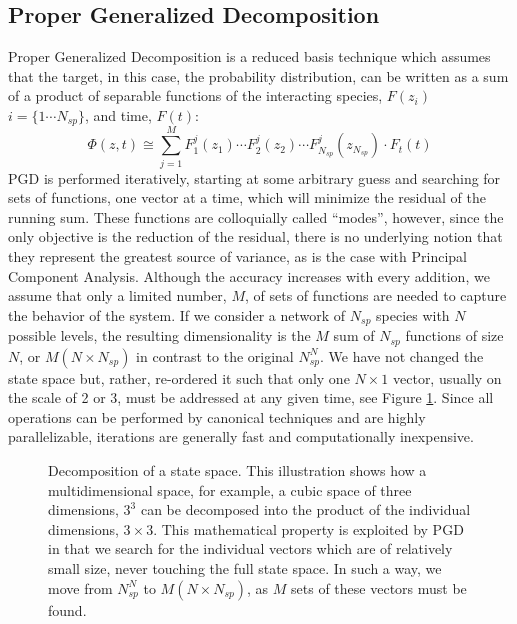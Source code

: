 \documentclass{article}
\begin{document}
\subsection{Proper Generalized Decomposition}\label{PGD}
Proper Generalized Decomposition \cite{chinesta2011overview,chinesta2013pgd} is a reduced basis technique which assumes that the target, in this case, the probability distribution, can be written as a sum of a product of separable functions of the interacting species, $F(z_i)$ $i=\{1\cdots N_{sp}\}$, and time, $F(t)$:
\[
 \Phi(z,t)\cong \sum_{j=1}^{M}F_1^j(z_1)\cdots F_2^j(z_2)\cdots F_{N_{sp}}^j(z_{N_{sp}}) \cdot F_t(t)
\]
PGD is performed iteratively, starting at some arbitrary guess and searching for sets of functions, one vector at a time, which will minimize the residual of the running sum. These functions are colloquially called ``modes'', however, since the only objective is the reduction of the residual, there is no underlying notion that they represent the greatest source of variance, as is the case with Principal Component Analysis. Although the accuracy increases with every addition, we assume that only a limited number, $M$, of sets of functions are needed to capture the behavior of the system. If we consider a network of $N_{sp}$ species with $N$ possible levels, the resulting dimensionality is the $M$ sum of $N_{sp}$ functions of size $N$, or $M(N\times N_{sp})$ in contrast to the original $N_{sp}^N$. We have not changed the state space but, rather, re-ordered it such that only one $N\times1$ vector, usually on the scale of 2 or 3, must be addressed at any given time, see Figure \ref{cubes}. Since all operations can be performed by canonical techniques and are highly parallelizable, iterations are generally fast and computationally inexpensive.
\begin{figure}[h]
\centering
{}
\caption{Decomposition of a state space. This illustration shows how a multidimensional space, for example, a cubic space of three dimensions, $3^3$ can be decomposed into the product of the individual dimensions, $3\times 3$. This mathematical property is exploited by PGD in that we search for the individual vectors which are of relatively small size, never touching the full state space. In such a way, we move from $N_{sp}^N$ to $M(N\times N_{sp})$, as $M$ sets of these vectors must be found.}
\label{cubes}
\end{figure}
\end{document}
